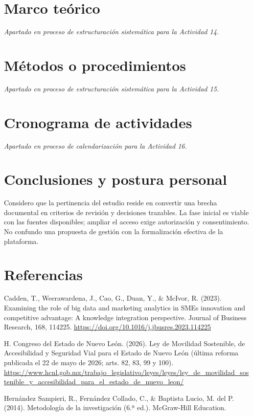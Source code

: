 {\section{Marco teórico}
\emph{Apartado en proceso de estructuración sistemática para la Actividad 14.}

\section{Métodos o procedimientos}
\emph{Apartado en proceso de estructuración sistemática para la Actividad 15.}

\section{Cronograma de actividades}
\emph{Apartado en proceso de calendarización para la Actividad 16.}

\section{Conclusiones y postura personal}
Considero que la pertinencia del estudio reside en convertir una brecha documental en criterios de revisión y decisiones trazables. La fase inicial es viable con las fuentes disponibles; ampliar el acceso exige autorización y consentimiento. No confundo una propuesta de gestión con la formalización efectiva de la plataforma.

\clearpage\section*{Referencias}
Cadden, T., Weerawardena, J., Cao, G., Duan, Y., \& McIvor, R. (2023). Examining the role of big data and marketing analytics in SMEs innovation and competitive advantage: A knowledge integration perspective. Journal of Business Research, 168, 114225. \url{https://doi.org/10.1016/j.jbusres.2023.114225}


H. Congreso del Estado de Nuevo León. (2026). Ley de Movilidad Sostenible, de Accesibilidad y Seguridad Vial para el Estado de Nuevo León (última reforma publicada el 22 de mayo de 2026; arts. 82, 83, 99 y 100). \url{https://www.hcnl.gob.mx/trabajo_legislativo/leyes/leyes/ley_de_movilidad_sostenible_y_accesibilidad_para_el_estado_de_nuevo_leon/}


Hernández Sampieri, R., Fernández Collado, C., \& Baptista Lucio, M. del P. (2014). Metodología de la investigación (6.ª ed.). McGraw-Hill Education.


}
